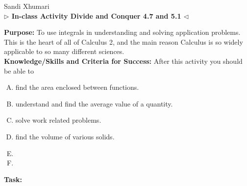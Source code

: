 \documentclass[answers]{exam}
\begin{document}
\begin{center}
	\hfill Sandi Xhumari \\ \textbf{$\triangleright$ In-class Activity Divide and Conquer 4.7 and 5.1 $\triangleleft$}\\
\end{center}

\textbf{Purpose:} To use integrals in understanding and solving application problems. This is the heart of all of Calculus 2, and the main reason Calculus is so widely applicable to so many different sciences.   \\

\textbf{Knowledge/Skills and Criteria for Success:} After this activity you should be able to

\begin{enumerate}[A.]
	\item find the area enclosed between functions.
	\item understand and find the average value of a quantity. 
	\item solve work related problems.
	\item find the volume of various solids.
	\item 
	\item 
	
\end{enumerate}

\textbf{Task:} 
\end{document}
